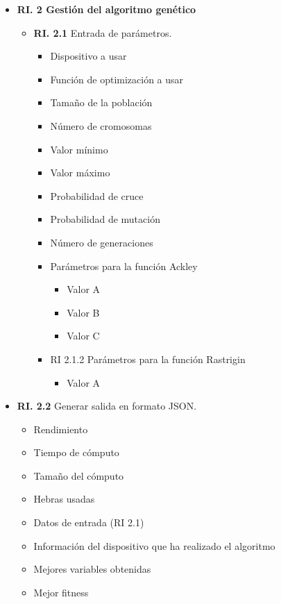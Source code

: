 \begin{itemize}
	\item  \textbf{RI. 2 Gestión del algoritmo genético}
	\begin{itemize}
		\item \textbf{RI. 2.1} Entrada de parámetros.
		\begin{itemize}
			\item Dispositivo a usar
			\item Función de optimización a usar
			\item Tamaño de la población
			\item Número de cromosomas
			\item Valor mínimo
			\item Valor máximo
			\item Probabilidad de cruce
			\item Probabilidad de mutación
			\item Número de generaciones
			\item Parámetros para la función Ackley
				\begin{itemize}
					\item Valor A
					\item Valor B
					\item Valor C
				\end{itemize}
				
			\item RI 2.1.2 Parámetros para la función Rastrigin
				\begin{itemize}
					\item Valor A
				\end{itemize}
			\end{itemize}
		\end{itemize}

		\item \textbf{RI. 2.2} Generar salida en formato JSON.
		\begin{itemize}
			\item Rendimiento
			\item Tiempo de cómputo
			\item Tamaño del cómputo
			\item Hebras usadas
			\item Datos de entrada (RI 2.1)
			\item Información del dispositivo que ha realizado el algoritmo
			\item Mejores variables obtenidas
			\item Mejor fitness
		\end{itemize}
	
\end{itemize}


